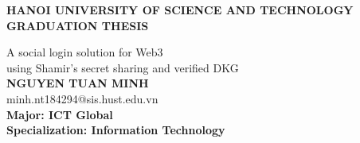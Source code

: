 \documentclass[Main.tex]{subfiles}
\begin{document}
\begin{titlepage}
\thispagestyle{empty}
\begin{center}

{\textbf{\large{HANOI UNIVERSITY OF SCIENCE AND TECHNOLOGY }}}\\[4cm]

{\textbf{\huge{GRADUATION THESIS}}}\\[1cm]
{\textbfw\Large{A social login solution for Web3 \\ using Shamir's secret sharing and verified DKG}\\[1cm]

{\textbf{\large{NGUYEN TUAN MINH}}}\\
{\large{minh.nt184294@sis.hust.edu.vn}}\\[0.5cm]

{\textbf{\large{Major: ICT Global }}}\\
{\textbf{\large{Specialization: Information Technology}}}\\

\begin{table}[H]
\centering
{}
\end{table}}
\end{center}



\end{titlepage}
\end{document}
